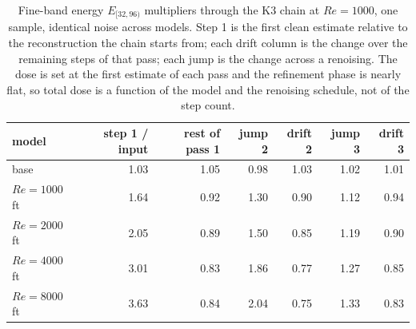 \begin{table}[t]
  \centering
  \caption{Fine-band energy $E_{[32,96)}$ multipliers through the K3 chain at $Re{=}1000$, one sample, identical noise across models. Step 1 is the first clean estimate relative to the reconstruction the chain starts from; each drift column is the change over the remaining steps of that pass; each jump is the change across a renoising. The dose is set at the first estimate of each pass and the refinement phase is nearly flat, so total dose is a function of the model and the renoising schedule, not of the step count.}
  \label{tab:chain-injection}
  \begin{tabular}{lrrrrrr}
    \toprule
    model & step 1 / input & rest of pass 1 & jump 2 & drift 2 & jump 3 & drift 3 \\
    \midrule
    base & 1.03 & 1.05 & 0.98 & 1.03 & 1.02 & 1.01 \\
    $Re{=}1000$ ft & 1.64 & 0.92 & 1.30 & 0.90 & 1.12 & 0.94 \\
    $Re{=}2000$ ft & 2.05 & 0.89 & 1.50 & 0.85 & 1.19 & 0.90 \\
    $Re{=}4000$ ft & 3.01 & 0.83 & 1.86 & 0.77 & 1.27 & 0.85 \\
    $Re{=}8000$ ft & 3.63 & 0.84 & 2.04 & 0.75 & 1.33 & 0.83 \\
    \bottomrule
  \end{tabular}
\end{table}
